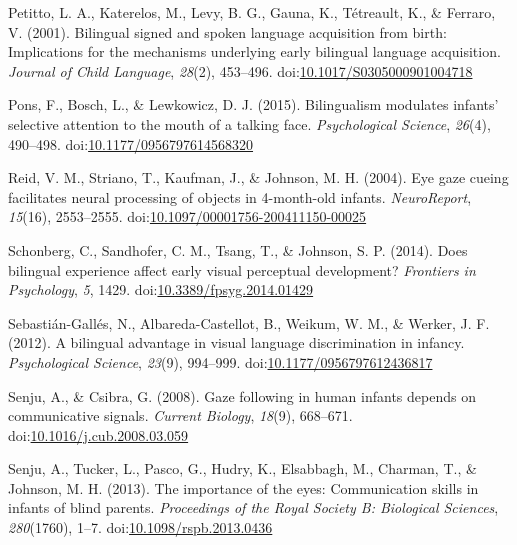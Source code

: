 \documentclass[,man,floatsintext]{apa6}
\begin{document}
\leavevmode\hypertarget{ref-Petitto_etal_2001}{}%
Petitto, L. A., Katerelos, M., Levy, B. G., Gauna, K., Tétreault, K., \& Ferraro, V. (2001). Bilingual signed and spoken language acquisition from birth: Implications for the mechanisms underlying early bilingual language acquisition. \emph{Journal of Child Language}, \emph{28}(2), 453--496. doi:\href{https://doi.org/10.1017/S0305000901004718}{10.1017/S0305000901004718}

\leavevmode\hypertarget{ref-Pons_etal_2015}{}%
Pons, F., Bosch, L., \& Lewkowicz, D. J. (2015). Bilingualism modulates infants' selective attention to the mouth of a talking face. \emph{Psychological Science}, \emph{26}(4), 490--498. doi:\href{https://doi.org/10.1177/0956797614568320}{10.1177/0956797614568320}

\leavevmode\hypertarget{ref-Reid_etal_2004}{}%
Reid, V. M., Striano, T., Kaufman, J., \& Johnson, M. H. (2004). Eye gaze cueing facilitates neural processing of objects in 4-month-old infants. \emph{NeuroReport}, \emph{15}(16), 2553--2555. doi:\href{https://doi.org/10.1097/00001756-200411150-00025}{10.1097/00001756-200411150-00025}

\leavevmode\hypertarget{ref-Schonberg_etal_2014}{}%
Schonberg, C., Sandhofer, C. M., Tsang, T., \& Johnson, S. P. (2014). Does bilingual experience affect early visual perceptual development? \emph{Frontiers in Psychology}, \emph{5}, 1429. doi:\href{https://doi.org/10.3389/fpsyg.2014.01429}{10.3389/fpsyg.2014.01429}

\leavevmode\hypertarget{ref-Sebastian-Galles_etal_2012}{}%
Sebastián-Gallés, N., Albareda-Castellot, B., Weikum, W. M., \& Werker, J. F. (2012). A bilingual advantage in visual language discrimination in infancy. \emph{Psychological Science}, \emph{23}(9), 994--999. doi:\href{https://doi.org/10.1177/0956797612436817}{10.1177/0956797612436817}

\leavevmode\hypertarget{ref-Senju_Csibra_2008}{}%
Senju, A., \& Csibra, G. (2008). Gaze following in human infants depends on communicative signals. \emph{Current Biology}, \emph{18}(9), 668--671. doi:\href{https://doi.org/10.1016/j.cub.2008.03.059}{10.1016/j.cub.2008.03.059}

\leavevmode\hypertarget{ref-Senju_etal_2013}{}%
Senju, A., Tucker, L., Pasco, G., Hudry, K., Elsabbagh, M., Charman, T., \& Johnson, M. H. (2013). The importance of the eyes: Communication skills in infants of blind parents. \emph{Proceedings of the Royal Society B: Biological Sciences}, \emph{280}(1760), 1--7. doi:\href{https://doi.org/10.1098/rspb.2013.0436}{10.1098/rspb.2013.0436}
\end{document}
